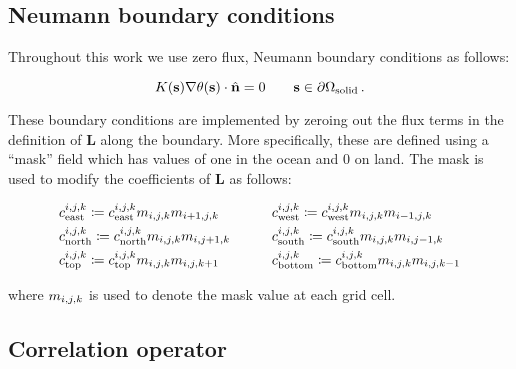 \subsection{Neumann boundary conditions}
\label{ssec:boundary_conditions}

Throughout this work we use zero flux, Neumann boundary conditions as follows:
\begin{linenomath*}\begin{equation*}
    K(\mathbf{s})\nabla\theta(\mathbf{s}) \cdot \hat{\mathbf{n}} = 0 \qquad \mathbf{s}\in\partial\Omega_{\text{solid}} \, .
\end{equation*}\end{linenomath*}
These boundary conditions are implemented by zeroing out the flux terms in the
definition of $\mathbf{L}$ along the boundary.
More specifically, these are defined using a ``mask'' field which has
values of one in the ocean and 0 on land.
The mask is used to modify the coefficients of $\mathbf{L}$ as follows:
\begin{linenomath*}\begin{equation*}
    \begin{aligned}
        &c_\text{east}^{i,j,k} \coloneqq c_\text{east}^{i,j,k}
            m_{{i,j,k}} m_{{i+1,j,k}}
        \qquad
        &&c_\text{west}^{i,j,k} \coloneqq c_\text{west}^{i,j,k}
            m_{{i,j,k}} m_{{i-1,j,k}}
        \\
        &c_\text{north}^{i,j,k} \coloneqq c_\text{north}^{i,j,k}
            m_{{i,j,k}} m_{{i,j+1,k}}
        \qquad
        &&c_\text{south}^{i,j,k} \coloneqq c_\text{south}^{i,j,k}
            m_{{i,j,k}} m_{{i,j-1,k}}
        \\
        &c_\text{top}^{i,j,k} \coloneqq c_\text{top}^{i,j,k}
            m_{{i,j,k}} m_{{i,j,k+1}}
        \qquad
        &&c_\text{bottom}^{i,j,k} \coloneqq c_\text{bottom}^{i,j,k}
            m_{{i,j,k}} m_{{i,j,k-1}}
    \end{aligned}
\end{equation*}\end{linenomath*}
where $m_{{i,j,k}}$ is used to denote the mask value at each grid cell.

\subsection{Correlation operator}
\label{ssec:correlation_fv}

